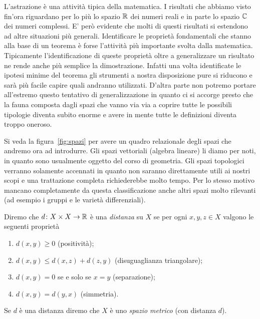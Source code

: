 L'astrazione è una attività tipica della matematica. I risultati che abbiamo
visto fin'ora riguardano per lo più lo spazio ${\mathbb R}$ dei numeri reali
e in parte lo spazio ${\mathbb C}$ dei numeri complessi.
E' però evidente che molti di questi risultati si estendono ad altre situazioni
più generali. Identificare le proprietà fondamentali che stanno alla base
di un teorema è forse l'attività più importante svolta dalla matematica.
Tipicamente l'identificazione di queste proprietà oltre a generalizzare
un risultato ne rende anche più semplice la dimostrazione.
Infatti una volta identificate le ipotesi minime del teorema
gli strumenti a nostra disposizione pure si riducono e sarà più facile
capire quali andranno utilizzati.
D'altra parte non potremo portare all'estremo questo tentativo di generalizzazione
in quanto ci si accorge presto che la fauna composta dagli spazi che vanno via
via a coprire tutte le possibili tipologie diventa subito enorme e avere
in mente tutte le definizioni diventa troppo oneroso.

Si veda la figura~\ref{fig:spazi} per avere un quadro relazionale
degli spazi che andremo ora ad introdurre.
Gli spazi vettoriali (algebra lineare) li diamo per noti, 
in quanto sono usualmente oggetto
del corso di geometria.
Gli spazi topologici verranno solamente accennati in quanto non saranno direttamente
utili ai nostri scopi e una trattazione completa richiederebbe molto tempo.
Per lo stesso motivo mancano completamente da questa classificazione anche altri
spazi molto rilevanti (ad esempio i gruppi e le varietà differenziali).


\begin{definition}
\mymark{**}
\label{def:distanza}
Diremo che $d\colon X\times X\to{\mathbb R}$ è una \emph{distanza}%
%
 su $X$
se per ogni $x,y,z\in X$ valgono le seguenti proprietà
\begin{enumerate}
\item
  $d(x,y)\ge 0$ (positività);
\item
  $d(x,y)\le d(x,z) + d(z,y)$ (disuguaglianza triangolare);
\item
  $d(x,y)=0$ se e solo se $x=y$ (separazione);
\item
  $d(x,y) = d(y,x)$ (simmetria).
\end{enumerate}

Se $d$ è una distanza
diremo che $X$ è uno
\emph{spazio metrico}
%
%
(con distanza $d$).
\end{definition}

